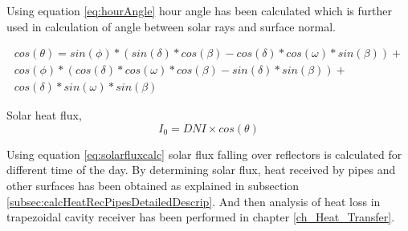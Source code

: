 Using equation \ref{eq:hourAngle} hour angle has been calculated which is further used in calculation of angle between solar rays and surface normal.

\begin{multline}
cos(\theta) = sin(\phi)*(sin(\delta)*cos(\beta)-cos(\delta)*cos(\omega)*sin(\beta))+\\
cos(\phi)*(cos(\delta)*cos(\omega)*cos(\beta)-sin(\delta)*sin(\beta))+ \\
cos(\delta)*sin(\omega)*sin(\beta)
\end{multline}

Solar heat flux,
\begin{equation}\label{eq:solarfluxcalc}
I_{0} = DNI\times cos(\theta)
\end{equation}

Using equation \ref{eq:solarfluxcalc} solar flux falling over reflectors is calculated for different time of the day. By determining solar flux, heat received by pipes and other surfaces has been obtained as explained in subsection \ref{subsec:calcHeatRecPipesDetailedDescrip}. And then analysis of heat loss in trapezoidal cavity receiver has been performed in chapter \ref{ch_Heat_Transfer}.











